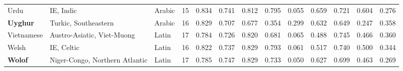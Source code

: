 \begin{tabular}{lllrrrrrrrrrr}
                           Urdu &                       IE, Indic &                Arabic &        15 &                       0.834 &                         0.741 &         0.812 &                  0.795 &            0.055 &                         0.659 &         0.721 &                  0.604 &            0.276 \\
                \textbf{Uyghur} &            Turkic, Southeastern &                Arabic &        16 &                       0.829 &                         0.707 &         0.677 &                  0.354 &            0.299 &                         0.632 &         0.649 &                  0.247 &            0.358 \\
                     Vietnamese &      Austro-Asiatic, Viet-Muong &                 Latin &        17 &                       0.784 &                         0.726 &         0.820 &                  0.681 &            0.065 &                         0.488 &         0.745 &                  0.466 &            0.360 \\
                          Welsh &                      IE, Celtic &                 Latin &        16 &                       0.822 &                         0.737 &         0.829 &                  0.793 &            0.061 &                         0.517 &         0.740 &                  0.500 &            0.344 \\
                 \textbf{Wolof} &  Niger-Congo, Northern Atlantic &                 Latin &        17 &                       0.785 &                         0.747 &         0.829 &                  0.733 &            0.050 &                         0.627 &         0.699 &                  0.463 &            0.269 \\
\bottomrule
\end{tabular}
